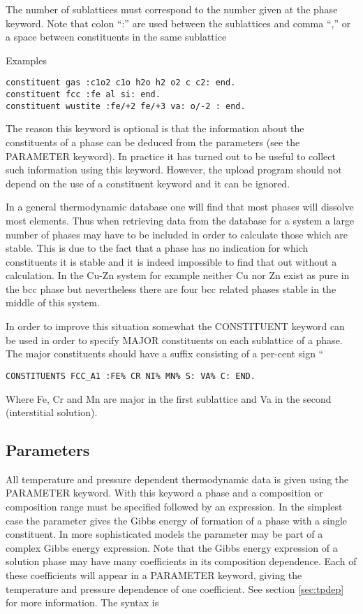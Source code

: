 \documentclass[12pt]{article}
\begin{document}
The number of sublattices must correspond to the number given at the
phase keyword. Note that colon ``:'' are used between the sublattices
and comma ``,'' or a space between constituents in the same sublattice

Examples

\begin{verbatim}
constituent gas :c1o2 c1o h2o h2 o2 c c2: end.
constituent fcc :fe al si: end.
constituent wustite :fe/+2 fe/+3 va: o/-2 : end.
\end{verbatim}

The reason this keyword is optional is that the information about
the constituents of a phase can be deduced from the parameters (see
the PARAMETER keyword). In practice it has turned out to be useful to
collect such information using this keyword. However, the upload
program should not depend on the use of a constituent keyword and it
can be ignored.

In a general thermodynamic database one will find that most phases
will dissolve most elements. Thus when retrieving data from the
database for a system a large number of phases may have to be included
in order to calculate those which are stable. This is due to the
fact that a phase has no indication for which constituents it is stable
and it is indeed impossible to find that out without a calculation.
In the Cu-Zn system for example neither Cu nor Zn exist as pure in the
bcc phase but nevertheless there are four bcc related phases stable in
the middle of this system.

In order to improve this situation somewhat the CONSTITUENT keyword
can be used in order to specify MAJOR constituents on each sublattice
of a phase. The major constituents should have a suffix consisting of
a per-cent sign ``%

\begin{verbatim}
CONSTITUENTS FCC_A1 :FE% CR NI% MN% S: VA% C: END.
\end{verbatim}

Where Fe, Cr and Mn are major in the first sublattice and Va in the
second (interstitial solution).

\subsection{Parameters}\label{sec:parameter}

All temperature and pressure dependent thermodynamic data is given
using the PARAMETER keyword. With this keyword a phase and a
composition or composition range must be specified followed by an
expression. In the simplest case the parameter gives the Gibbs energy
of formation of a phase with a single constituent. In more
sophisticated models the parameter may be part of a complex Gibbs
energy expression. Note that the Gibbs energy expression of a solution
phase may have many coefficients in its composition dependence. Each
of these coefficients will appear in a PARAMETER keyword, giving the
temperature and pressure dependence of one coefficient. See section
\ref{sec:tpdep} for more information. The syntax is
\end{document}
